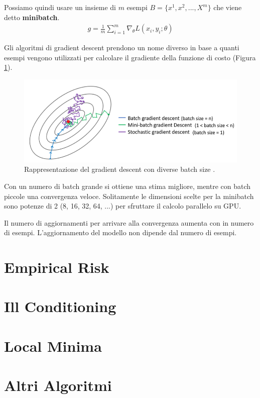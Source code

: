Possiamo quindi usare un insieme di $m$ esempi $B = \{x^1, x^2, ..., X^m\}$ che viene detto \textbf{minibatch}.
\begin{align*}
  g = \frac{1}{m} \sum_{i=1}^m \nabla_\theta L(x_i, y_i; \theta)
\end{align*}

Gli algoritmi di gradient descent prendono un nome diverso in base a quanti esempi vengono utilizzati per calcolare il gradiente della funzione di costo (Figura \ref{fig:gradient-descent}).

\begin{figure}[h]
  \centering
  \includegraphics[width=0.9\linewidth]{images/gradient-descent.png}
  \caption{Rappresentazione del gradient descent con diverse batch size \cite{img:gradient-descent}.}
  \label{fig:gradient-descent}
\end{figure}

Con un numero di batch grande si ottiene una stima migliore, mentre con batch piccole una convergenza veloce.
Solitamente le dimensioni scelte per la minibatch sono potenze di 2 (8, 16, 32, 64, ...) per sfruttare il calcolo parallelo su GPU.

Il numero di aggiornamenti per arrivare alla convergenza aumenta con in numero di esempi.
L'aggiornamento del modello non dipende dal numero di esempi.

\section{Empirical Risk}

\section{Ill Conditioning}

\section{Local Minima}

\section{Altri Algoritmi}

